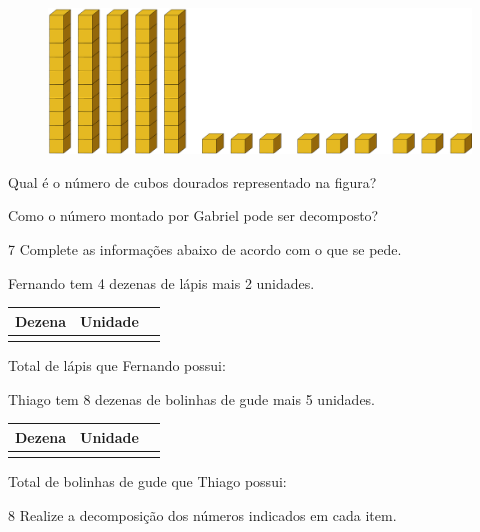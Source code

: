 \begin{figure}[htpb!]
\includegraphics[width=\textwidth]{./media/image3.png}
\end{figure}

Qual é o número de cubos dourados representado na figura?


Como o número montado por Gabriel pode ser decomposto?


\num{7} Complete as informações abaixo de acordo com o que se pede. 

\begin{escolha}

\item
  Fernando tem 4 dezenas de lápis mais 2 unidades.

\begin{longtable}[]{@{}lll@{}}
\toprule
Dezena & Unidade\tabularnewline
\midrule
\endhead
&\tabularnewline
\bottomrule
\end{longtable}

Total de lápis que Fernando possui:

\item Thiago tem 8 dezenas de bolinhas de gude mais 5 unidades.

\begin{longtable}[]{@{}lll@{}}
\toprule
Dezena & Unidade\tabularnewline
\midrule
\endhead
&\tabularnewline
\bottomrule
\end{longtable}


Total de bolinhas de gude que Thiago possui:
\end{escolha}

\num{8} Realize a decomposição dos números indicados em cada item.

